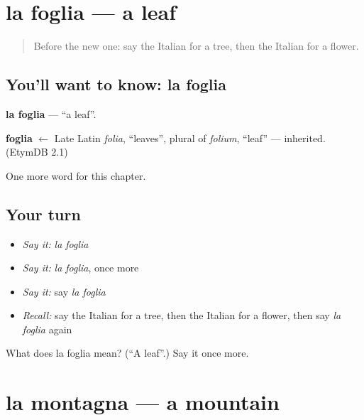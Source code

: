 \section[la foglia]{la foglia — a leaf}

\label{lesson:IT-C64-foglia}



\begin{quote}
Before the new one: say the Italian for a tree, then the Italian for a flower.
\end{quote}

\subsection*{You'll want to know: la foglia}
\textbf{la foglia} — \textquotedblleft{}a leaf\textquotedblright{}.

\begin{cousinweb}
\textbf{foglia} $\leftarrow$ Late Latin \emph{folia}, \textquotedblleft{}leaves\textquotedblright{}, plural of \emph{folium}, \textquotedblleft{}leaf\textquotedblright{} — inherited. (EtymDB 2.1)
\end{cousinweb}

\begin{grammarlens}[title={What you've built}]
One more word for this chapter.
\end{grammarlens}

\subsection*{Your turn}
\begin{itemize}
\raggedright
  \item \emph{Say it:} \emph{la foglia}
  \item \emph{Say it:} \emph{la foglia}, once more
  \item \emph{Say it:} say \emph{la foglia}
  \item \emph{Recall:} say the Italian for a tree, then the Italian for a flower, then say \emph{la foglia} again
\end{itemize}

\begin{tcolorbox}[breakable,colback=teal!4,colframe=teal!35!black,title={Before you move on}]
What does la foglia mean? (\textquotedblleft{}A leaf\textquotedblright{}.) Say it once more.
\end{tcolorbox}
\section[la montagna]{la montagna — a mountain}

